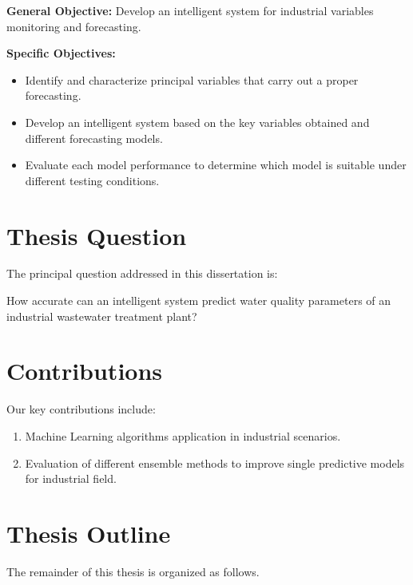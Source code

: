 \textbf{General Objective:} Develop an intelligent system for industrial variables monitoring and forecasting.

\textbf{Specific Objectives:}

\begin{itemize}
\item Identify and characterize principal variables that carry out a proper forecasting.
\item Develop an intelligent system based on the key variables obtained and different forecasting models.
\item Evaluate each model performance to determine which model is suitable under different testing conditions.
\end{itemize}

\section{Thesis Question}
\label{s:Question}
The principal question addressed in this dissertation is:

How accurate can an intelligent system predict water quality parameters of an industrial wastewater treatment plant?

\section{Contributions}
\label{s:Contributions}

Our key contributions include:

\begin{enumerate}

  \item Machine Learning algorithms application in industrial scenarios. 
  
  \item Evaluation of different ensemble methods to improve single predictive models for industrial field.

\end{enumerate}

\section{Thesis Outline}
\label{s:Outline}

The remainder of this thesis is organized as follows. 

